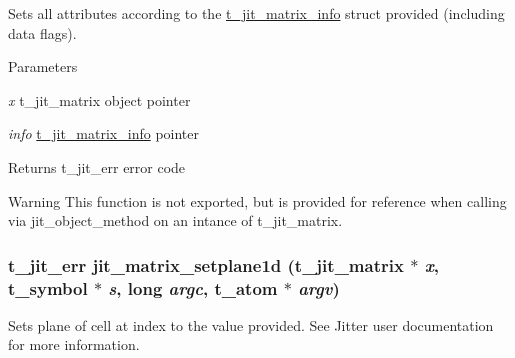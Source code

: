 Sets all attributes according to the \hyperlink{structt__jit__matrix__info}{t\_\-jit\_\-matrix\_\-info} struct provided (including data flags). 
\begin{DoxyParams}{Parameters}
\item[{\em x}]t\_\-jit\_\-matrix object pointer \item[{\em info}]\hyperlink{structt__jit__matrix__info}{t\_\-jit\_\-matrix\_\-info} pointer\end{DoxyParams}
\begin{DoxyReturn}{Returns}
t\_\-jit\_\-err error code
\end{DoxyReturn}
\begin{DoxyWarning}{Warning}
This function is not exported, but is provided for reference when calling via jit\_\-object\_\-method on an intance of t\_\-jit\_\-matrix. 
\end{DoxyWarning}
\hypertarget{group__matrixmod_ga5b631df680bd059a5dd241a803863664}{
\subsubsection[{jit\_\-matrix\_\-setplane1d}]{\setlength{\rightskip}{0pt plus 5cm}t\_\-jit\_\-err jit\_\-matrix\_\-setplane1d (t\_\-jit\_\-matrix $\ast$ {\em x}, \/  {\bf t\_\-symbol} $\ast$ {\em s}, \/  long {\em argc}, \/  {\bf t\_\-atom} $\ast$ {\em argv})}}
\label{group__matrixmod_ga5b631df680bd059a5dd241a803863664}


Sets plane of cell at index to the value provided. See Jitter user documentation for more information.


